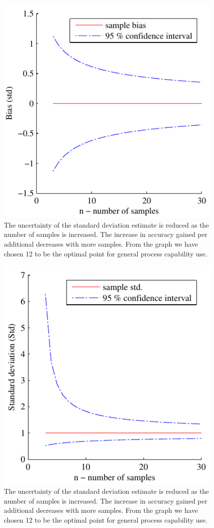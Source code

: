 \documentclass[aip,amsmath, reprint, author-year]{revtex4-1}
\begin{document}
\begin{figure}
\includegraphics{stats_bias_confidence.pdf}
\caption{\label{fig:std_uncertainty}The uncertainty of the standard deviation estimate is reduced as the number of samples is increased. The increase in accuracy gained per additional decreases with more samples. From the graph we have chosen 12 to be the optimal point for general process capability use.}
\end{figure}

\begin{figure}
\includegraphics{stats_std_confidence.pdf}
\caption{\label{fig:std_uncertainty}The uncertainty of the standard deviation estimate is reduced as the number of samples is increased. The increase in accuracy gained per additional decreases with more samples. From the graph we have chosen 12 to be the optimal point for general process capability use.}
\end{figure}
\end{document}
